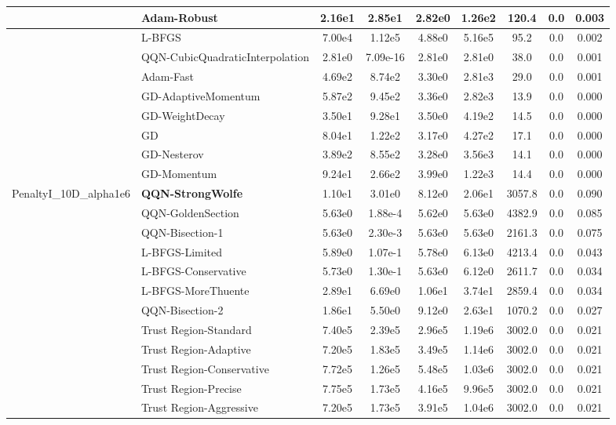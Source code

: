 \documentclass[10pt]{article}
\begin{document}
\begin{longtable}{|l|l|c|c|c|c|c|c|c|}
\hline
 & Adam-Robust & 2.16e1 & 2.85e1 & 2.82e0 & 1.26e2 & 120.4 & 0.0 & 0.003 \\
\hline
 & L-BFGS & 7.00e4 & 1.12e5 & 4.88e0 & 5.16e5 & 95.2 & 0.0 & 0.002 \\
\hline
 & QQN-CubicQuadraticInterpolation & 2.81e0 & 7.09e-16 & 2.81e0 & 2.81e0 & 38.0 & 0.0 & 0.001 \\
\hline
 & Adam-Fast & 4.69e2 & 8.74e2 & 3.30e0 & 2.81e3 & 29.0 & 0.0 & 0.001 \\
\hline
 & GD-AdaptiveMomentum & 5.87e2 & 9.45e2 & 3.36e0 & 2.82e3 & 13.9 & 0.0 & 0.000 \\
\hline
 & GD-WeightDecay & 3.50e1 & 9.28e1 & 3.50e0 & 4.19e2 & 14.5 & 0.0 & 0.000 \\
\hline
 & GD & 8.04e1 & 1.22e2 & 3.17e0 & 4.27e2 & 17.1 & 0.0 & 0.000 \\
\hline
 & GD-Nesterov & 3.89e2 & 8.55e2 & 3.28e0 & 3.56e3 & 14.1 & 0.0 & 0.000 \\
\hline
 & GD-Momentum & 9.24e1 & 2.66e2 & 3.99e0 & 1.22e3 & 14.4 & 0.0 & 0.000 \\
PenaltyI\_10D\_alpha1e6 & \textbf{QQN-StrongWolfe} & 1.10e1 & 3.01e0 & 8.12e0 & 2.06e1 & 3057.8 & 0.0 & 0.090 \\
\hline
 & QQN-GoldenSection & 5.63e0 & 1.88e-4 & 5.62e0 & 5.63e0 & 4382.9 & 0.0 & 0.085 \\
\hline
 & QQN-Bisection-1 & 5.63e0 & 2.30e-3 & 5.63e0 & 5.63e0 & 2161.3 & 0.0 & 0.075 \\
\hline
 & L-BFGS-Limited & 5.89e0 & 1.07e-1 & 5.78e0 & 6.13e0 & 4213.4 & 0.0 & 0.043 \\
\hline
 & L-BFGS-Conservative & 5.73e0 & 1.30e-1 & 5.63e0 & 6.12e0 & 2611.7 & 0.0 & 0.034 \\
\hline
 & L-BFGS-MoreThuente & 2.89e1 & 6.69e0 & 1.06e1 & 3.74e1 & 2859.4 & 0.0 & 0.034 \\
\hline
 & QQN-Bisection-2 & 1.86e1 & 5.50e0 & 9.12e0 & 2.63e1 & 1070.2 & 0.0 & 0.027 \\
\hline
 & Trust Region-Standard & 7.40e5 & 2.39e5 & 2.96e5 & 1.19e6 & 3002.0 & 0.0 & 0.021 \\
\hline
 & Trust Region-Adaptive & 7.20e5 & 1.83e5 & 3.49e5 & 1.14e6 & 3002.0 & 0.0 & 0.021 \\
\hline
 & Trust Region-Conservative & 7.72e5 & 1.26e5 & 5.48e5 & 1.03e6 & 3002.0 & 0.0 & 0.021 \\
\hline
 & Trust Region-Precise & 7.75e5 & 1.73e5 & 4.16e5 & 9.96e5 & 3002.0 & 0.0 & 0.021 \\
\hline
 & Trust Region-Aggressive & 7.20e5 & 1.73e5 & 3.91e5 & 1.04e6 & 3002.0 & 0.0 & 0.021 \\

\end{longtable}
\end{document}
